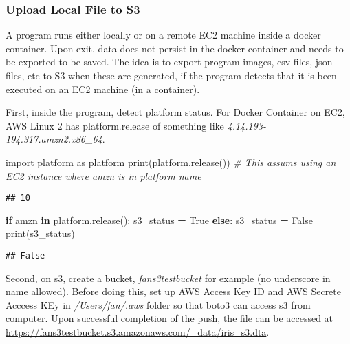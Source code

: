\documentclass[
]{book}
\newenvironment{Shaded}{\begin{snugshade}}{\end{snugshade}}
\newcommand{\BuiltInTok}[1]{#1}
\newcommand{\CommentTok}[1]{\textcolor[rgb]{0.56,0.35,0.01}{\textit{#1}}}
\newcommand{\ControlFlowTok}[1]{\textcolor[rgb]{0.13,0.29,0.53}{\textbf{#1}}}
\newcommand{\ImportTok}[1]{#1}
\newcommand{\KeywordTok}[1]{\textcolor[rgb]{0.13,0.29,0.53}{\textbf{#1}}}
\newcommand{\NormalTok}[1]{#1}
\newcommand{\OperatorTok}[1]{\textcolor[rgb]{0.81,0.36,0.00}{\textbf{#1}}}
\newcommand{\StringTok}[1]{\textcolor[rgb]{0.31,0.60,0.02}{#1}}
\newcommand{\VariableTok}[1]{\textcolor[rgb]{0.00,0.00,0.00}{#1}}
\begin{document}
\hypertarget{upload-local-file-to-s3}{%
\subsubsection{Upload Local File to S3}\label{upload-local-file-to-s3}}

A program runs either locally or on a remote EC2 machine inside a docker container. Upon exit, data does not persist in the docker container and needs to be exported to be saved. The idea is to export program images, csv files, json files, etc to S3 when these are generated, if the program detects that it is been executed on an EC2 machine (in a container).

First, inside the program, detect platform status. For Docker Container on EC2, AWS Linux 2 has platform.release of something like \emph{4.14.193-194.317.amzn2.x86\_64}.

\begin{Shaded}
\begin{Highlighting}[]
\ImportTok{import}\NormalTok{ platform }\ImportTok{as}\NormalTok{ platform}
\BuiltInTok{print}\NormalTok{(platform.release())}
\CommentTok{\# This assums using an EC2 instance where amzn is in platform name}
\end{Highlighting}
\end{Shaded}

\begin{verbatim}
## 10
\end{verbatim}

\begin{Shaded}
\begin{Highlighting}[]
\ControlFlowTok{if} \StringTok{\textquotesingle{}amzn\textquotesingle{}} \KeywordTok{in}\NormalTok{ platform.release():}
\NormalTok{    s3\_status }\OperatorTok{=} \VariableTok{True}
\ControlFlowTok{else}\NormalTok{:}
\NormalTok{    s3\_status }\OperatorTok{=} \VariableTok{False}
\BuiltInTok{print}\NormalTok{(s3\_status)}
\end{Highlighting}
\end{Shaded}

\begin{verbatim}
## False
\end{verbatim}

Second, on s3, create a bucket, \emph{fans3testbucket} for example (no underscore in name allowed). Before doing this, set up AWS Access Key ID and AWS Secrete Acccess KEy in \emph{/Users/fan/.aws} folder so that boto3 can access s3 from computer. Upon successful completion of the push, the file can be accessed at \url{https://fans3testbucket.s3.amazonaws.com/_data/iris_s3.dta}.
\end{document}
